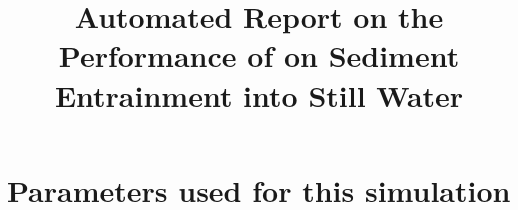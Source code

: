 \documentclass[11pt,a4paper]{article}%
\begin{document}
 

\title{Automated Report on the Performance of \anuga{} on Sediment Entrainment into Still Water}
\maketitle




\section{Parameters used for this simulation}






\end{document}
